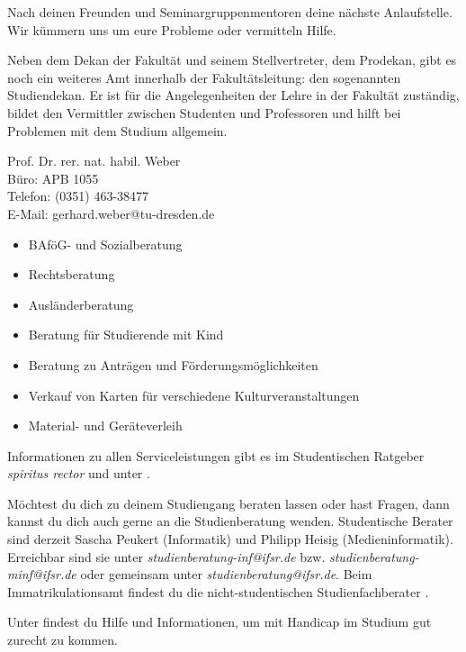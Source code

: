 
Nach deinen Freunden und Seminargruppenmentoren deine nächste Anlaufstelle.
Wir kümmern uns um eure Probleme oder vermitteln Hilfe.

Neben dem Dekan der Fakultät und seinem Stellvertreter, dem Prodekan, gibt es noch ein weiteres Amt innerhalb der Fakultätsleitung:
den sogenannten Studiendekan.
Er ist für die Angelegenheiten der Lehre in der Fakultät zuständig, bildet den Vermittler zwischen Studenten und Professoren und hilft bei Problemen mit dem Studium allgemein.

Prof. Dr. rer. nat. habil. Weber \\
Büro: APB 1055 \\
Telefon: (0351) 463-38477 \\
E-Mail: gerhard.weber@tu-dresden.de

\begin{itemize}
\item BAföG- und Sozialberatung
\item Rechtsberatung
\item Ausländerberatung
\item Beratung für Studierende mit Kind
\item Beratung zu Anträgen und Förderungsmöglichkeiten
\item Verkauf von Karten für verschiedene Kulturveranstaltungen
\item Material- und Geräteverleih
\end{itemize}

Informationen zu allen Serviceleistungen gibt es im Studentischen Ratgeber \textit{spiritus rector}  und unter .

Möchtest du dich zu deinem Studiengang beraten lassen oder hast Fragen, dann kannst du dich auch gerne an die Studienberatung wenden.
Studentische Berater sind derzeit Sascha Peukert (Informatik) und Philipp Heisig (Medieninformatik).
Erreichbar sind sie unter \textit{studienberatung-inf@ifsr.de} bzw. \textit{studienberatung-minf@ifsr.de} oder gemeinsam unter \textit{studienberatung@ifsr.de}.
Beim Immatrikulationsamt findest du die nicht-studentischen Studienfachberater .

Unter  findest du Hilfe und Informationen, um mit Handicap im Studium gut zurecht zu kommen.

